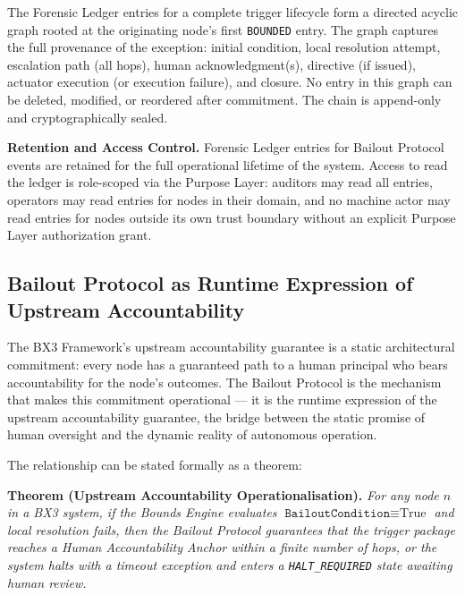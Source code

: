 \bigskip

The Forensic Ledger entries for a complete trigger lifecycle form a directed acyclic
graph rooted at the originating node's first \texttt{BOUNDED} entry. The graph
captures the full provenance of the exception: initial condition, local resolution
attempt, escalation path (all hops), human acknowledgment(s), directive (if issued),
actuator execution (or execution failure), and closure. No entry in this graph can
be deleted, modified, or reordered after commitment. The chain is append-only and
cryptographically sealed.

\bigskip

\begin{note}
\textbf{Retention and Access Control.} Forensic Ledger entries for Bailout Protocol
events are retained for the full operational lifetime of the system. Access to read
the ledger is role-scoped via the Purpose Layer: auditors may read all entries,
operators may read entries for nodes in their domain, and no machine actor may read
entries for nodes outside its own trust boundary without an explicit Purpose Layer
authorization grant.
\end{note}


\subsection{Bailout Protocol as Runtime Expression of Upstream Accountability}
\label{sec:runtime-expression}

The BX3 Framework's upstream accountability guarantee is a static architectural
commitment: every node has a guaranteed path to a human principal who bears
accountability for the node's outcomes. The Bailout Protocol is the mechanism that
makes this commitment operational — it is the runtime expression of the upstream
accountability guarantee, the bridge between the static promise of human oversight
and the dynamic reality of autonomous operation.

\bigskip

The relationship can be stated formally as a theorem:

\bigskip

\noindent\textbf{Theorem (Upstream Accountability Operationalisation).}
\textit{For any node $n$ in a BX3 system, if the Bounds Engine evaluates
$\texttt{BailoutCondition} \equiv \text{True}$ and local resolution fails, then the
Bailout Protocol guarantees that the trigger package reaches a Human Accountability
Anchor within a finite number of hops, or the system halts with a timeout exception
and enters a \texttt{HALT\_REQUIRED} state awaiting human review.}

